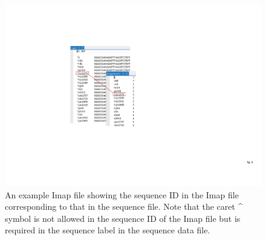\documentclass{book}
\numberwithin{equation}{section} \renewcommand{\baselinestretch}{0.55}
\begin{document}
\begin{figure}[ht]
  \centering \includegraphics[scale=0.567890]{figures/fig-imap}
  \caption{An example Imap file showing the sequence ID in the Imap
    file corresponding to that in the sequence file. Note that the
    caret \^{} symbol is not allowed in the sequence ID of the Imap
    file but is required in the sequence label in the sequence data
    file.}
  \label{fig-imap}
\end{figure}
\end{document}
